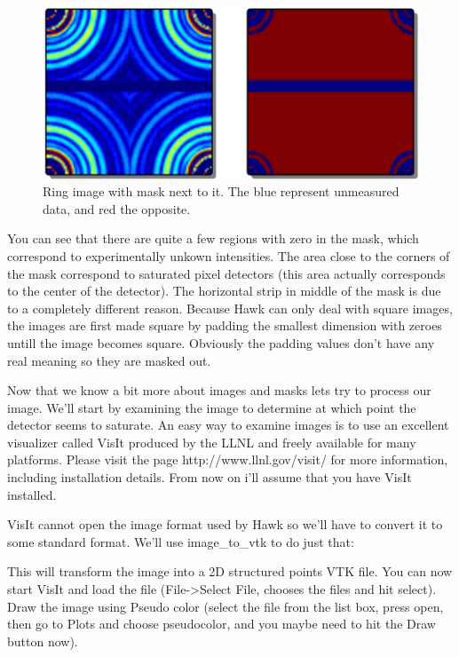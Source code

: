 \documentclass{report}
\begin{document}


\begin{figure}[htp]
\centering
\includegraphics[scale=0.4]{ring_and_mask_svg.png}
\caption{Ring image with mask next to it. The blue represent unmeasured data, and red the opposite.}
\label{ring-mask}
\end{figure}

You can see that there are quite a few regions with zero in the mask, which correspond to experimentally unkown intensities.
The area close to the corners of the mask correspond to saturated pixel detectors (this area actually corresponds to the
center of the detector). The horizontal strip in middle of the mask is due to a completely different reason. Because
Hawk can only deal with square images, the images are first made square by padding the smallest dimension with zeroes untill
the image becomes square. Obviously the padding values don't have any real meaning so they are masked out.


Now that we know a bit more about images and masks lets try to process our image.
We'll start by examining the image to determine at which point the detector seems to saturate.
An easy way to examine images is to use an excellent visualizer called VisIt produced by the LLNL
and freely available for many platforms. Please visit the page http://www.llnl.gov/visit/ for
more information, including installation details. From now on i'll assume that you have VisIt installed.


VisIt cannot open the image format used by Hawk so we'll have to convert it to some standard format. We'll use 
image\_to\_vtk to do just that:


This will transform the image into a 2D structured points VTK file.
You can now start VisIt and load the file (File->Select File, chooses the files and hit select).
Draw the image using Pseudo color (select the file from the list box, press open, 
then go to Plots and choose pseudocolor, and you maybe need to hit the Draw button now).
\end{document}
